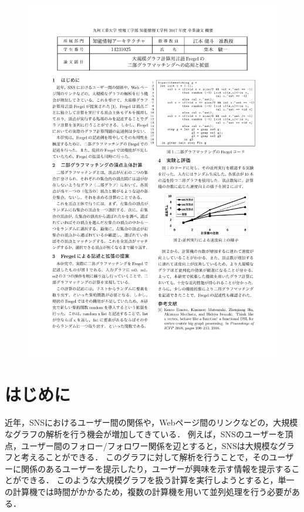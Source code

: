 \documentclass[12pt]{ujreport}
\begin{document}
\makeCoverPageII
\newpage

\begin{figure}
  \centering
  \includegraphics[width=21.0cm]{abst.pdf}
\end{figure}

\restoregeometry

\pagestyle{plain}
\tableofcontents 		%
\newpage
{} 	%

\chapter{はじめに}
近年，SNSにおけるユーザー間の関係や，Webページ間のリンクなどの，大規模なグラフの解析を行う機会が増加してきている．
例えば，SNSのユーザーを頂点，ユーザー間のフォロー/フォロワー関係を辺とすると，SNSは大規模なグラフと考えることができる．
このグラフに対して解析を行うことで，そのユーザーに関係のあるユーザーを提示したり，ユーザーが興味を示す情報を提示することができる．
このような大規模グラフを扱う計算を実行しようとすると，単一の計算機では時間がかかるため，複数の計算機を用いて並列処理を行う必要がある．
\end{document}
